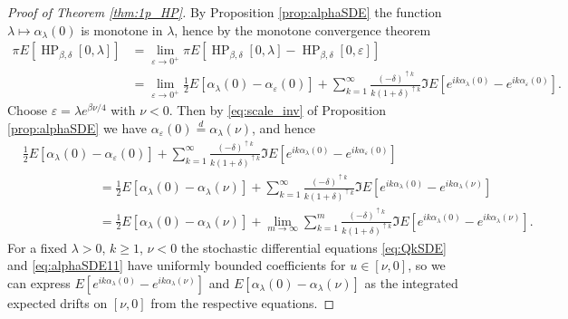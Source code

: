 \documentclass[12pt]{article}
\theoremstyle{definition} %
\newcommand{\eps}{\varepsilon}
\theoremstyle{remark} %
\newcommand{\HPb}{\operatorname{HP}_{\beta, \delta}}
\newcommand{\ed}{\stackrel{d}{=}}
\begin{document}
\begin{proof}[Proof of Theorem \ref{thm:1p_HP}]
By Proposition \ref{prop:alphaSDE} the function $\lambda\mapsto \alpha_\lambda(0)$ is monotone in $\lambda$, hence by the monotone convergence theorem 
\begin{align*}
  \pi   E[\HPb[0,\lambda]]&=\lim_{\eps\to 0^+} \pi E[\HPb[0,\lambda]-\HPb[0,\eps  ]]\\
  &=\lim_{\eps\to 0^+} \frac12 E[\alpha_\lambda(0)-\alpha_{\eps}(0)]+\sum_{k=1}^\infty \frac{(-\delta)^{\uparrow k}}{k (1+\delta)^{\uparrow k}} \Im E[e^{i k \alpha_\lambda(0)}-e^{i k \alpha_{\eps}(0)}].
\end{align*}
Choose $\eps=\lambda e^{\beta \nu/4}$ with $\nu<0$. Then by \eqref{eq:scale_inv} of Proposition \ref{prop:alphaSDE} we have $\alpha_{\eps}(0)\ed \alpha_\lambda(\nu)$, and hence
\begin{align*}
& \frac12 E[\alpha_\lambda(0)-\alpha_{\eps}(0)]+\sum_{k=1}^\infty \frac{(-\delta)^{\uparrow k}}{k (1+\delta)^{\uparrow k}}\Im E[e^{i k \alpha_\lambda(0)}-e^{i k \alpha_{\eps}(0)}]\\
&\qquad\qquad \qquad =\frac12 E[\alpha_\lambda(0)-\alpha_{\lambda}(\nu)]+\sum_{k=1}^\infty \frac{(-\delta)^{\uparrow k}}{k (1+\delta)^{\uparrow k}}\Im E[e^{i k \alpha_\lambda(0)}-e^{i k \alpha_{\lambda}(\nu)}]\\
&\qquad \qquad\qquad =\frac12 E[\alpha_\lambda(0)-\alpha_{\lambda}(\nu)]+\lim_{m\to \infty}\sum_{k=1}^m \frac{(-\delta)^{\uparrow k}}{k (1+\delta)^{\uparrow k}}\Im E[e^{i k \alpha_\lambda(0)}-e^{i k \alpha_{\lambda}(\nu)}].
\end{align*}
For a fixed $\lambda>0$, $k\ge 1$, $\nu<0$ the stochastic differential equations  \eqref{eq:QkSDE} and \eqref{eq:alphaSDE11}  have uniformly bounded coefficients for $u\in [\nu,0]$, so we can express $E[e^{i k \alpha_\lambda(0)}-e^{i k \alpha_{\lambda}(\nu)}]$ and $E[\alpha_\lambda(0)-\alpha_\lambda(\nu)]$ as the integrated expected drifts on $[\nu,0]$ from the respective  equations.


\end{proof}
\end{document}
